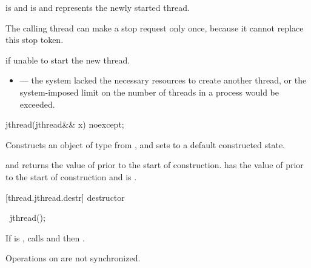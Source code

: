 \begin{itemdescr}
\pnum\postconditions {}
{\color{diffcolor}
                     is  and
                      is  and
}
                      represents the newly started thread.
{\color{diffcolor}
\begin{note} The calling thread can make a stop request only once,
                because it cannot replace this stop token.  \end{note}
}%

\pnum\throws {} if unable to start the new thread.

\pnum\errors
\begin{itemize}
\item {} --- the system lacked the necessary
resources to create another thread, or the system-imposed limit on the number of
threads in a process would be exceeded.
\end{itemize}
\end{itemdescr}

%
\begin{itemdecl}
jthread(jthread&& x) noexcept;
\end{itemdecl}

\begin{itemdescr}
\pnum
\effects Constructs an object of type  from , and sets
 to a default constructed state.

\pnum
\postconditions {} and  returns the
value of  prior to the start of construction.
{\color{diffcolor}
 has the value of  prior to the start of construction
and  is .
}%

\end{itemdescr}

[thread.jthread.destr]{ destructor}

%
\begin{itemdecl}
~jthread();
\end{itemdecl}

{\color{diffcolor}
\begin{itemdescr}
\pnum
If  is , calls  and then .
\begin{note} Operations on  are not synchronized. \end{note}
\end{itemdescr}
}%

